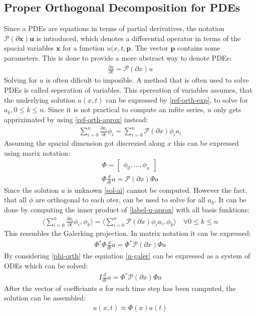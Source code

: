\subsection{Proper Orthogonal Decomposition for PDEs}
Since a PDEs are equations in terms of partial derivatives, the notation \(\mathscr{P}(\partial \textbf{x}) \textbf{u}\) is introduced, which denotes a differential operator in terms of the spacial variables \(\textbf{x}\) for a function \(u(x,t,\textbf{p}\).
The vector \(\textbf{p}\) contains some parameters.
This is done to provide a more abstract way to denote PDEs:
\begin{gather}
\frac{\partial u}{\partial t} = \mathscr{P}(\partial x) u
\end{gather}
\cite{Gustafsson2011f}
Solving for \(u\) is often dificult to imposible.
A method that is often used to solve PDEs is called seperation of variables.
This spereation of variables assumes, that the underlying solution \(u(x, t)\) can be expressed by \ref{ref-orth-exp}, to solve for \(a_k, 0 \leq k \leq n\).
Since it is not practical to compute an infite series, \(u\) only gets appriximated by using \ref{ref-orth-aprox} instead:
\begin{gather}
\sum_{i = 0} ^{n} \frac{\partial a_i}{\partial t} \phi_i = \sum_{i = 0} ^{n} \mathscr{P}(\partial x) \phi_i a_i \label{label-u-aprox} 
\end{gather}
Assuming the spacial dimension got discrezied along \(x\) this can be expressed using marix notation:
\begin{gather}
\Phi = \begin{bmatrix}
\phi_0, ..., \phi_n
\end{bmatrix} \label{mat-phi}\\
\Phi \frac{d}{dt}a = \mathscr{P}(\partial x) \Phi a
\end{gather}
Since the solution \(u\) is unknown \ref{sol-ai} cannot be computed.
However the fact, that all \(\phi\) are orthogonal to each oter, can be used to solve for all \(a_k\).
It can be done by computing the inner product of \ref{label-u-aprox} with all basis funktions:
\begin{gather}
\langle \sum_{i = 0} ^{n} \frac{\partial a_i}{\partial t} \phi_i, \phi_k \rangle = \langle\sum_{i = 0} ^{n} \mathscr{P}(\partial x) \phi_i a_i, \phi_k \rangle \quad \forall 0 \leq k \leq n \label{u-galer}
\end{gather}
This resembles the Galerking projection.
In matrix notation it can be expressed:
\begin{gather}
\Phi^{*}\Phi \frac{d}{dt}a = \Phi^{*}\mathscr{P}(\partial x) \Phi a
\end{gather}
By considering \ref{phi-orth}  the equiation \ref{u-galer} can be expressed as a system of ODEs which can be solved:
\begin{gather}
I \frac{d}{dt} a = \Phi^{*}\mathscr{P}(\partial x) \Phi a
\end{gather}
After the vector of coefficiants \(a\) for each time step has been computed, the solution can be assembled:
\begin{gather}
u(x, t) \approx \Phi(x)a(t)
\end{gather} 
\cite{brunton_kutz_2019c}
